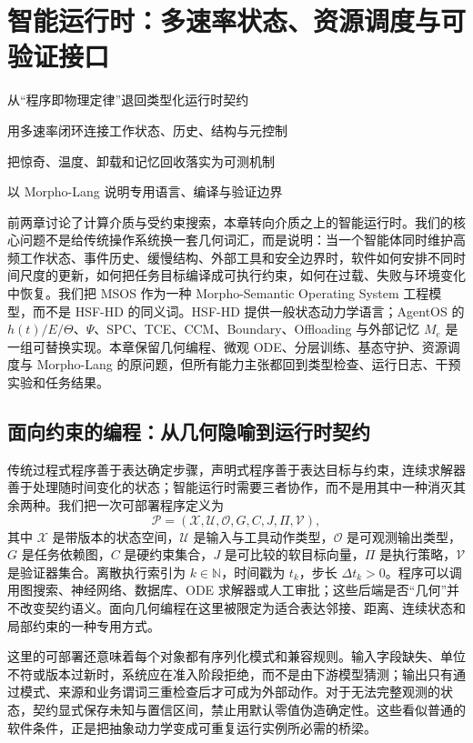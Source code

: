 \chapter{智能运行时：多速率状态、资源调度与可验证接口}
\label{chap:software_control_msos}

\begin{introduction}
\item 从“程序即物理定律”退回类型化运行时契约
\item 用多速率闭环连接工作状态、历史、结构与元控制
\item 把惊奇、温度、卸载和记忆回收落实为可测机制
\item 以 Morpho-Lang 说明专用语言、编译与验证边界
\end{introduction}

前两章讨论了计算介质与受约束搜索，本章转向介质之上的智能运行时。我们的核心问题不是给传统操作系统换一套几何词汇，而是说明：当一个智能体同时维护高频工作状态、事件历史、缓慢结构、外部工具和安全边界时，软件如何安排不同时间尺度的更新，如何把任务目标编译成可执行约束，如何在过载、失败与环境变化中恢复。我们把 MSOS 作为一种 Morpho-Semantic Operating System 工程模型，而不是 HSF-HD 的同义词。HSF-HD 提供一般状态动力学语言；AgentOS 的 $h(t)/E/\Theta$、$\Psi$、SPC、TCE、CCM、Boundary、Offloading 与外部记忆 $M_e$ 是一组可替换实现。本章保留几何编程、微观 ODE、分层训练、基态守护、资源调度与 Morpho-Lang 的原问题，但所有能力主张都回到类型检查、运行日志、干预实验和任务结果。

\section{面向约束的编程：从几何隐喻到运行时契约}
\label{sec:section_2467}

传统过程式程序善于表达确定步骤，声明式程序善于表达目标与约束，连续求解器善于处理随时间变化的状态；智能运行时需要三者协作，而不是用其中一种消灭其余两种。我们把一次可部署程序定义为
\[
\mathcal P=(\mathcal X,\mathcal U,\mathcal O,G,C,J,\Pi,\mathcal V),
\]
其中 $\mathcal X$ 是带版本的状态空间，$\mathcal U$ 是输入与工具动作类型，$\mathcal O$ 是可观测输出类型，$G$ 是任务依赖图，$C$ 是硬约束集合，$J$ 是可比较的软目标向量，$\Pi$ 是执行策略，$\mathcal V$ 是验证器集合。离散执行索引为 $k\in\mathbb N$，时间戳为 $t_k$，步长 $\Delta t_k>0$。程序可以调用图搜索、神经网络、数据库、ODE 求解器或人工审批；这些后端是否“几何”并不改变契约语义。面向几何编程在这里被限定为适合表达邻接、距离、连续状态和局部约束的一种专用方式。

这里的可部署还意味着每个对象都有序列化模式和兼容规则。输入字段缺失、单位不符或版本过新时，系统应在准入阶段拒绝，而不是由下游模型猜测；输出只有通过模式、来源和业务谓词三重检查后才可成为外部动作。对于无法完整观测的状态，契约显式保存未知与置信区间，禁止用默认零值伪造确定性。这些看似普通的软件条件，正是把抽象动力学变成可重复运行实例所必需的桥梁。

